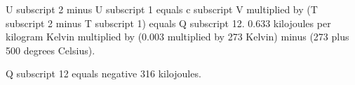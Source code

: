 U subscript 2 minus U subscript 1 equals c subscript V multiplied by (T subscript 2 minus T subscript 1) equals Q subscript 12.  
0.633 kilojoules per kilogram Kelvin multiplied by (0.003 multiplied by 273 Kelvin) minus (273 plus 500 degrees Celsius).  

Q subscript 12 equals negative 316 kilojoules.